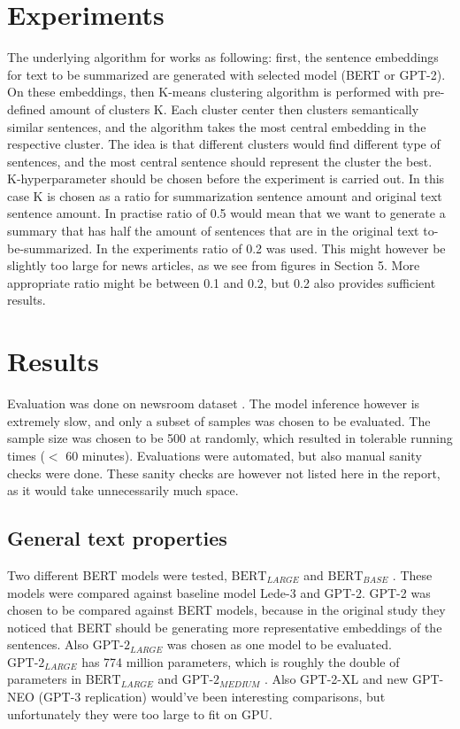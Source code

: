 \documentclass{article}
\newcommand{\bertlarge}{$\text{BERT}_{LARGE}$ }
\newcommand{\bertbase}{$\text{BERT}_{BASE}$ }
\newcommand{\gptmedium}{$\text{GPT-2}_{MEDIUM}$ }
\newcommand{\gptlarge}{$\text{GPT-2}_{LARGE}$ }
\begin{document}
\section{Experiments}

The underlying algorithm for \cite{extractive_bert} works as following: first, the sentence embeddings for text to be summarized are generated with selected model (BERT or GPT-2). On these embeddings, then K-means clustering algorithm is performed with pre-defined amount of clusters K. Each cluster center then clusters semantically similar sentences, and the algorithm takes the most central embedding in the respective cluster. The idea is that different clusters would find different type of sentences, and the most central sentence should represent the cluster the best.\\

K-hyperparameter should be chosen before the experiment is carried out. In this case K is chosen as a ratio for summarization sentence amount and original text sentence amount. In practise ratio of 0.5 would mean that we want to generate a summary that has half the amount of sentences that are in the original text to-be-summarized. In the experiments ratio of 0.2 was used. This might however be slightly too large for news articles, as we see from figures in Section 5. More appropriate ratio might be between 0.1 and 0.2, but 0.2 also provides sufficient results. \\

\clearpage
\section{Results}

Evaluation was done on newsroom dataset \cite{dataset}. The model inference however is extremely slow, and only a subset of samples was chosen to be evaluated. The sample size was chosen to be 500 at randomly, which resulted in tolerable running times ($<$ 60 minutes). Evaluations were automated, but also manual sanity checks were done. These sanity checks are however not listed here in the report, as it would take unnecessarily much space. \\

\subsection{General text properties}

\noindent
Two different BERT models were tested, \bertlarge and \bertbase. These models were compared against baseline model Lede-3 and GPT-2. GPT-2 was chosen to be compared against BERT models, because in the original study \cite{extractive_bert} they noticed that BERT should be generating more representative embeddings of the sentences. Also \gptlarge was chosen as one model to be evaluated. \gptlarge has 774 million parameters, which is roughly the double of parameters in \bertlarge and \gptmedium. Also GPT-2-XL and new GPT-NEO (GPT-3 replication) would've been interesting comparisons, but unfortunately they were too large to fit on GPU.\\
\end{document}
